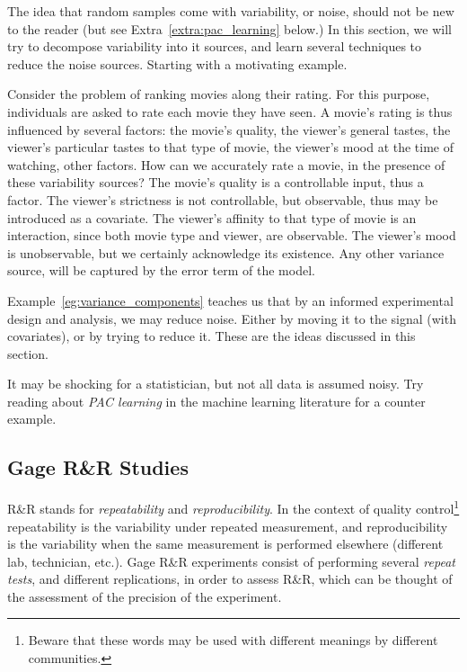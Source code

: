 The idea that random samples come with variability, or noise, should not be new to the reader (but see Extra~\ref{extra:pac_learning} below.)
In this section, we will try to decompose variability into it sources, and learn several techniques to reduce the noise sources. 
Starting with a motivating example.



\begin{example}
\label{eg:variance_components}
Consider the problem of ranking movies along their rating.
For this purpose, individuals are asked to rate each movie they have seen.
A movie's rating is thus influenced by several factors:
the movie's quality, 
the viewer's general tastes, 
the viewer's particular tastes to that type of movie,
the viewer's mood at the time of watching,
other factors.
How can we accurately rate a movie, in the presence of these variability sources?
The movie's quality is a controllable input, thus a factor.
The viewer's strictness is not controllable, but observable, thus may be introduced as a covariate.
The viewer's affinity to that type of movie is an interaction, since both movie type and viewer, are observable.
The viewer's mood is unobservable, but we certainly acknowledge its existence. 
Any other variance source, will be captured by the error term of the model. 
\end{example}

Example~\ref{eg:variance_components} teaches us that by an informed experimental design and analysis, we may reduce noise.
Either by moving it to the signal (with covariates), or by trying to reduce it.
These are the ideas discussed in this section.


\begin{extra}
\label{extra:pac_learning}
It may be shocking for a statistician, but not all data is assumed noisy.
Try reading about \emph{PAC learning} in the machine learning literature for a counter example.
\end{extra}




\subsection{Gage R\&R Studies}
R\&R stands for \emph{repeatability} and \emph{reproducibility}.
In the context of quality control\footnote{Beware that these words may be used with different meanings by different communities.} repeatability is the variability under repeated measurement, and reproducibility is the variability when the same measurement is performed elsewhere (different lab, technician, etc.).
Gage R\&R experiments consist of performing several \emph{repeat tests}, and different replications, in order to assess R\&R, which can be thought of the assessment of the precision of the experiment. 




